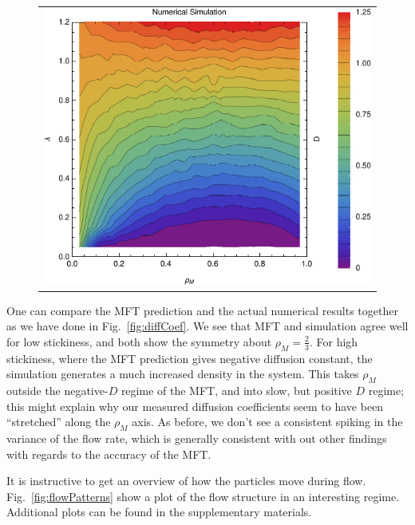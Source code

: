 \begin{figure}[h!]
\begin{center}
\begin{tabular}{c}
    \includegraphics[width=0.98\linewidth]{../tex-src/images/newDataFlow}
    \end{tabular}
\end{center}
    \vspace{-2em}
\end{figure}

One can compare the MFT prediction and the actual numerical results together as we have done in Fig.~\ref{fig:diffCoef}. We see that MFT and simulation agree well for low stickiness, and both show the symmetry
about $\rho_M = \frac{2}{3}$. For high stickiness, where the MFT prediction gives negative diffusion constant, the simulation generates a much increased density in the system.  This takes $\rho_M$ outside the negative-$D$ regime of the MFT,
and into slow, but positive $D$ regime; this might explain why our measured diffusion coefficients seem to have been ``stretched'' along the $\rho_M$ axis. As before, we don't see a consistent spiking in the variance of the flow rate,
which is generally consistent with out other findings with
regards to the accuracy of the MFT.

It is instructive to get an overview of how the particles move during flow. Fig.~\ref{fig:flowPatterns} show a plot of the flow structure in an interesting regime. Additional plots can be found in the supplementary materials.


